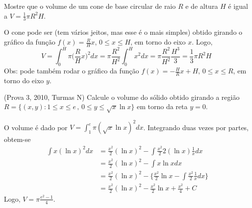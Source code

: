 \begin{exo}
Mostre que o volume de um cone de base circular de raio $R$ e de altura $H$ é
igual a $V=\frac{1}{3}\pi R^2H$.
\begin{sol}
O cone pode ser (tem vários jeitos, mas esse é o mais simples) 
obtido girando o gráfico da função $f(x)=\frac{R}{H}x$, $0\leq x\leq H$, em
torno do eixo $x$. Logo,
$$
V=\int_0^H\pi\big(\frac{R}{H}x\Big)^2dx=\pi\frac{R^2}{H^2}\int_0^Hx^2dx=
\pi\frac{R^2}{H^2}\frac{H^3}{3}=\frac{1}{3}\pi R^2H \,\,$$
Obs: pode também rodar o gráfico da função $f(x)=-\frac{H}{R}x+H$, $0\leq x\leq
R$, em torno do eixo $y$.
\end{sol}
\end{exo}

\begin{exo}(Prova 3, 2010, Turmas N)
Calcule o volume do sólido obtido girando a região $R=\{(x,y):1\leq x\leq
e\,,\,0\leq y\leq \sqrt{x}\ln x\}$ em torno da reta $y=0$.
\begin{sol}
O volume é dado por $V=\int_1^e\pi(\sqrt{x}\ln x)^2dx$. Integrando duas vezes
por partes, obtem-se
\begin{align*}
\int x(\ln x)^2dx&=\frac{x^2}{2}(\ln x)^2-\int \frac{x^2}{2}2(\ln
x)\frac{1}{x}dx\\
&=\frac{x^2}{2}(\ln x)^2-\int x\ln xdx\\
&=\frac{x^2}{2}(\ln x)^2-\big\{\frac{x^2}{2}\ln x-\int\frac{x^2}{2}\frac{1}{x}dx
\big\}\\
&=\frac{x^2}{2}(\ln x)^2-\frac{x^2}{2}\ln x+\frac{x^2}{4}+C
\end{align*}
Logo, $V=\pi\frac{e^2-1}{4}$.
\end{sol}
\end{exo}

